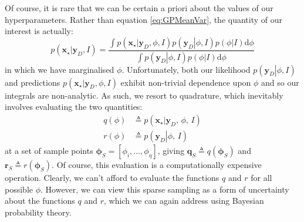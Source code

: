 \documentclass{acmtrans2m}
\newcommand{\ud}{\mathrm{d}}
\newcommand{\p}[2]{p\!\left(\left.#1\right|#2\right)}
\newcommand{\vect}[1]{\boldsymbol{#1}}
\newcommand{\vx}{\vect{x}}
\newcommand{\vxst}{\vx_\star}
\newcommand{\vyD}{\vect{y}_D}
\newcommand{\vph}{\vect{\phi}}
\newcommand{\vphS}{\vph_S}
\newcommand{\defequal}{\triangleq}
\begin{document}
\noindent Of course, it is rare that we can be certain a priori about the values of our hyperparameters. Rather than equation \eqref{eq:GPMeanVar}, the quantity of our interest is actually:
\small\begin{equation} \label{eq:Marginalising}
 \p{\vxst}{\vyD,I}=\frac{\int \p{\vxst}{\vyD,\phi,I}\p{\vyD}{\phi,I}\p{\phi}{I}\ud\phi}
{\int \p{\vyD}{\phi,I}\p{\phi}{I}\ud\phi}
\end{equation}\normalsize
in which we have marginalised $\phi$. Unfortunately, both our likelihood $\p{\vyD}{\phi,I}$ and predictions $\p{\vxst}{\vyD,\phi,I}$ exhibit non-trivial dependence upon $\phi$ and so our integrals are non-analytic. As such, we resort to quadrature, which inevitably involves evaluating the two quantities:
\begin{equation}
\begin{split}
q(\phi)& \defequal \p{\vxst}{\vyD,\,\phi,\,I} \\
r(\phi)& \defequal \p{\vyD}{\phi,\,I}
\end{split}
\end{equation}
at a set of sample points $\vphS=[\phi_i,\ldots,\phi_\eta]$, giving $\vect{q}_S\defequal q(\vphS)$ and $\vect{r}_S\defequal r(\vphS)$. Of course, this evaluation is a computationally expensive operation. Clearly, we can't afford to evaluate the functions $q$ and $r$ for all possible $\phi$. However, we can view this sparse sampling as a form of uncertainty about the functions $q$ and $r$, which we can again address using Bayesian probability theory. 
\end{document}
